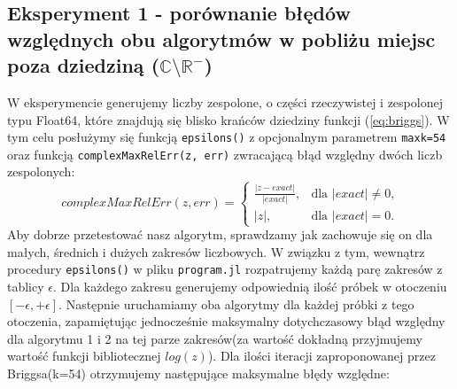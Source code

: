 \documentclass{article}
\begin{document}
	\subsection{Eksperyment 1 - porównanie błędów względnych obu algorytmów w pobliżu  miejsc poza dziedziną ($\mathbb{C}\setminus\mathbb{R}^-$)}
	W eksperymencie generujemy liczby zespolone, o części rzeczywistej i zespolonej typu Float64, które znajdują się blisko krańców dziedziny funkcji (\ref{eq:briggs}). W tym celu posłużymy się funkcją \texttt{epsilons()} z opcjonalnym parametrem \texttt{maxk=54} oraz funkcją \texttt{complexMaxRelErr(z, err)} zwracającą błąd względny dwóch liczb zespolonych:
	\begin{equation}
	complexMaxRelErr(z, err)=
	\begin{cases}
		\frac{|z-exact|}{|exact|}, 	& \text{dla $|exact|\neq0$,}\\
		|z|, 			   			& \text{dla $|exact|=0$.}
	\end{cases}
	\end{equation}
Aby dobrze przetestować nasz algorytm, sprawdzamy jak zachowuje się on dla małych, średnich i dużych zakresów liczbowych. W związku z tym, wewnątrz procedury \texttt{epsilons()} w pliku \texttt{program.jl} rozpatrujemy każdą parę zakresów z tablicy $\epsilon$. Dla każdego zakresu generujemy odpowiednią ilość próbek w otoczeniu $[-\epsilon, +\epsilon]$. Następnie uruchamiamy oba algorytmy dla każdej próbki z tego otoczenia, zapamiętując jednocześnie maksymalny dotychczasowy błąd względny dla algorytmu 1 i 2 na tej parze zakresów(za wartość dokładną przyjmujemy wartość funkcji bibliotecznej $log(z)$). Dla ilości iteracji zaproponowanej przez Briggsa(k=54) otrzymujemy następujące maksymalne błędy względne:
\end{document}
